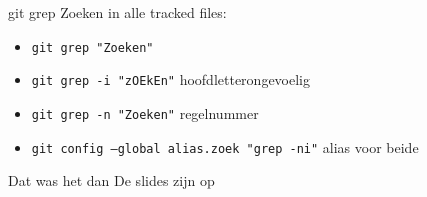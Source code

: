 \begin{frame}{git grep}
	Zoeken in alle tracked files:
	\begin{itemize}
		\item \texttt{git grep "Zoeken"}
		\item \texttt{git grep -i "zOEkEn"} hoofdletterongevoelig
		\item \texttt{git grep -n "Zoeken"} regelnummer
		\item \texttt{git config --global alias.zoek "grep -ni"} alias voor beide
	\end{itemize}
\end{frame}

\begin{frame}{Dat was het dan}
	De slides zijn op
\end{frame}
